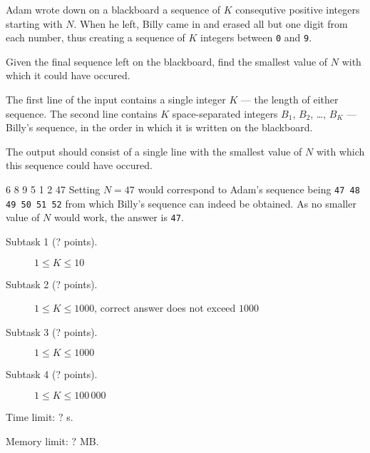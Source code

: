 \documentclass{boi2014}
\newcommand{\constant}[1]{{\tt #1}}
\begin{document}
    Adam wrote down on a blackboard a sequence of $K$ consequtive
    positive integers starting with $N$. When he left, Billy came
    in and erased all but one digit from each number, thus creating a
    sequence of $K$ integers between \constant{0} and \constant{9}.

    \Task

    Given the final sequence left on the blackboard, find the smallest
    value of $N$ with which it could have occured.

    \Input

	The first line of the input contains a single integer $K$ --- the length of
	either sequence. The second line contains $K$ space-separated integers
	$B_1$, $B_2$, \dots, $B_K$ --- Billy's sequence, in the order in which it
	is written on the blackboard.

    \Output

    The output should consist of a single line with the smallest value of
    $N$ with which this sequence could have occured.

    \Example

    \example
    {
        6 8 9 5 1 2
    }
    {
        47
    }
    {
        Setting $N = 47$ would correspond to Adam's sequence
        being \constant{47 48 49 50 51 52} from which Billy's sequence
        can indeed be obtained. As no smaller value of $N$
        would work, the answer is \constant{47}.
    }

\Scoring

\begin{description}
    \item[Subtask 1 (? points).] $1 \le K \le 10$
    \item[Subtask 2 (? points).] $1 \le K \le 1000$, correct
        answer does not exceed $1000$
    \item[Subtask 3 (? points).] $1 \le K \le 1000$
    \item[Subtask 4 (? points).] $1 \le K \le 100\,000$
\end{description}

\Constraints

Time limit: $?$ s.

Memory limit: $?$ MB.
\end{document}
